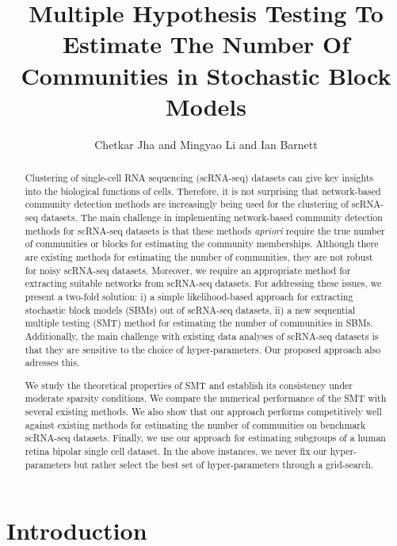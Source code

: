 \documentclass[11pt]{article}
\begin{document}

\title{Multiple Hypothesis Testing To Estimate The Number Of Communities in Stochastic Block Models}
\author{Chetkar Jha and Mingyao Li and Ian Barnett}


\maketitle

\begin{abstract}
Clustering of single-cell RNA sequencing (scRNA-seq) datasets can give key insights into the biological functions of cells. Therefore, it is not surprising that network-based community detection methods are increasingly being used for the clustering of scRNA-seq datasets. The main challenge in implementing network-based community detection methods for scRNA-seq datasets is that these methods \emph{apriori} require the true number of communities or blocks for estimating the community memberships. Although there are existing methods for estimating the number of communities, they are not robust for noisy scRNA-seq datasets. 
Moreover, we require an appropriate method for extracting suitable networks from scRNA-seq datasets. For addressing these issues, we present a two-fold solution: i) a simple likelihood-based approach for extracting stochastic block models (SBMs) out of scRNA-seq datasets, ii) a new sequential multiple testing (SMT) method for estimating the number of communities in SBMs. Additionally, the main challenge with existing data analyses of scRNA-seq datasets is that they are sensitive to the choice of hyper-parameters. Our proposed approach also adresses this. 

We study the theoretical properties of SMT and establish its consistency under moderate sparsity conditions. We compare the numerical performance of the SMT with several existing methods. We also show that our approach performs competitively well against existing methods for estimating the number of communities on benchmark scRNA-seq datasets. Finally, we use our approach for estimating subgroups of a human retina bipolar single cell dataset. In the above instances, we never fix our hyper-parameters but rather select the best set of hyper-parameters through a grid-search.
\end{abstract}


\section{Introduction}
\end{document}
